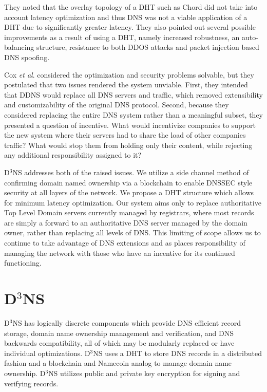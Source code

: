 \documentclass[11pt]{IEEEtran} %
\begin{document}
They noted that the overlay topology of a DHT such as Chord did not take into account latency optimization and thus DNS was not a viable application of a DHT due to significantly greater latency. They also pointed out several possible improvements as a result of using a DHT, namely increased robustness, an auto-balancing structure, resistance to both DDOS attacks and packet injection based DNS spoofing.


Cox \textit{et al}. considered the optimization and security problems solvable, but they postulated that two issues rendered the system unviable. First, they intended that DDNS would replace all DNS servers and traffic, which removed extensibility and customizability of the original DNS protocol. Second, because they considered replacing the entire DNS system rather than a meaningful subset, they presented a question of incentive. What would incentivize companies to support the new system where their servers had to share the load of other companies traffic?  What would stop them from holding only their content, while rejecting any additional responsibility assigned to it?
 
 
D$^3$NS addresses both of the raised issues. 
We utilize a side channel method of confirming domain named ownership via a blockchain \cite{namecoin} to enable DNSSEC style security at all layers of the network. 
We propose a DHT structure which allows for minimum latency optimization. 
Our system aims only to replace authoritative Top Level Domain servers currently managed by registrars, where most records are simply a forward to an authoritative DNS server managed by the domain owner, rather than replacing all levels of DNS. 
This limiting of scope allows us to continue to take advantage of DNS extensions and as places responsibility of managing the network with those who have an incentive for its continued functioning.



\section{D$^{3}$NS}
D$^{3}$NS has logically discrete components which provide DNS efficient record storage, domain name ownership management and verification, and DNS backwards compatibility, all of which may be modularly replaced or have individual optimizations. 
D$^{3}$NS uses a DHT to store DNS records in a distributed fashion and a blockchain and Namecoin \cite{namecoin} analog to manage domain name ownership.  
D$^{3}$NS utilizes public and private key encryption for signing and verifying records.
\end{document}
